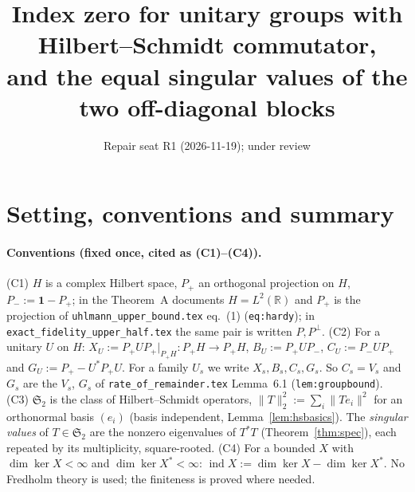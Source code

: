 \documentclass[11pt]{article}
\title{Index zero for unitary groups with Hilbert--Schmidt commutator,\\
and the equal singular values of the two off-diagonal blocks}
\author{Repair seat R1 (2026-11-19); under review}
\date{}
\newcommand{\Stwo}{\mathfrak S_2}
\newcommand{\Pp}{P_+}\newcommand{\Pm}{P_-}
\newcommand{\one}{\mathbf 1}
\newcommand{\norm}[1]{\lVert#1\rVert}
\newcommand{\ind}{\operatorname{ind}}
\newcommand{\Pperp}{P^\perp}\newcommand{\Gs}{\mathcal G}
\begin{document}
\maketitle

\section{Setting, conventions and summary}\label{sec:setting}
\paragraph{Conventions (fixed once, cited as (C1)--(C4)).}
(C1) $H$ is a complex Hilbert space, $\Pp$ an orthogonal projection on $H$, $\Pm:=\one-\Pp$; in the Theorem~A
documents $H=L^2(\mathbb R)$ and $\Pp$ is the projection of \texttt{uhlmann\_upper\_bound.tex} eq.~(1)
(\texttt{eq:hardy}); in \texttt{exact\_fidelity\_upper\_half.tex} the same pair is written $P,\Pperp$.
(C2) For a unitary $U$ on $H$:
$X_U:=\Pp U\Pp|_{\Pp H}:\Pp H\to\Pp H$, $B_U:=\Pp U\Pm$, $C_U:=\Pm U\Pp$ and
$G_U:=\Pp-U^*\Pp U$.  For a family $U_s$ we write $X_s,B_s,C_s,G_s$.  So $C_s=V_s$ and $G_s$ are the $V_s$, $G_s$
of \texttt{rate\_of\_remainder.tex} Lemma~6.1 (\texttt{lem:groupbound}).
(C3) $\Stwo$ is the class of Hilbert--Schmidt operators, $\norm T_2^2:=\sum_i\norm{Te_i}^2$ for an orthonormal
basis $(e_i)$ (basis independent, Lemma~\ref{lem:hsbasics}).  The \emph{singular values} of $T\in\Stwo$ are the
nonzero eigenvalues of $T^*T$ (Theorem~\ref{thm:spec}), each repeated by its multiplicity, square-rooted.
(C4) For a bounded $X$ with $\dim\ker X<\infty$ and $\dim\ker X^*<\infty$:
$\ind X:=\dim\ker X-\dim\ker X^*$.  No Fredholm theory is used; the finiteness is proved where needed.
\end{document}

